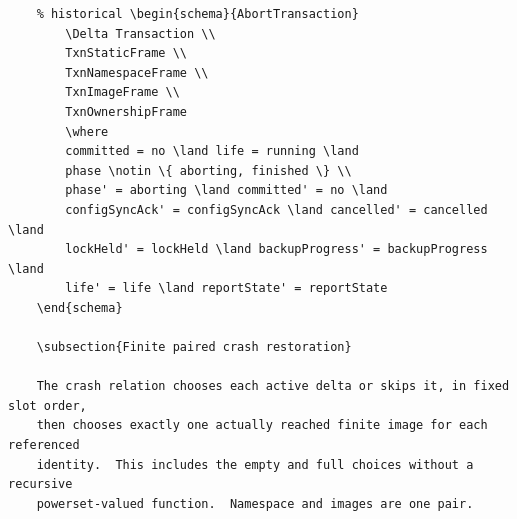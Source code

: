 \documentclass{article}
\begin{document}
\begin{verbatim}
	% historical \begin{schema}{AbortTransaction}
		\Delta Transaction \\
		TxnStaticFrame \\
		TxnNamespaceFrame \\
		TxnImageFrame \\
		TxnOwnershipFrame
		\where
		committed = no \land life = running \land
		phase \notin \{ aborting, finished \} \\
		phase' = aborting \land committed' = no \land
		configSyncAck' = configSyncAck \land cancelled' = cancelled \land
		lockHeld' = lockHeld \land backupProgress' = backupProgress \land
		life' = life \land reportState' = reportState
	\end{schema}

	\subsection{Finite paired crash restoration}

	The crash relation chooses each active delta or skips it, in fixed slot order,
	then chooses exactly one actually reached finite image for each referenced
	identity.  This includes the empty and full choices without a recursive
	powerset-valued function.  Namespace and images are one pair.


\end{verbatim}
\end{document}
